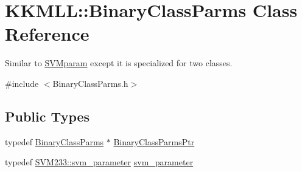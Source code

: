 \hypertarget{class_k_k_m_l_l_1_1_binary_class_parms}{}\section{K\+K\+M\+LL\+:\+:Binary\+Class\+Parms Class Reference}
\label{class_k_k_m_l_l_1_1_binary_class_parms}


Similar to \hyperlink{class_k_k_m_l_l_1_1_s_v_mparam}{S\+V\+Mparam} except it is specialized for two classes.  




{\ttfamily \#include $<$Binary\+Class\+Parms.\+h$>$}

\subsection*{Public Types}
\begin{DoxyCompactItemize}
\item 
typedef \hyperlink{class_k_k_m_l_l_1_1_binary_class_parms}{Binary\+Class\+Parms} $\ast$ \hyperlink{class_k_k_m_l_l_1_1_binary_class_parms_a97baab4d7e51018b31648a2f5a36a988}{Binary\+Class\+Parms\+Ptr}
\item 
typedef \hyperlink{struct_s_v_m233_1_1svm__parameter}{S\+V\+M233\+::svm\+\_\+parameter} \hyperlink{class_k_k_m_l_l_1_1_binary_class_parms_ae660a06ef9477c95e89b3f1e883ca858}{svm\+\_\+parameter}
\end{DoxyCompactItemize}
